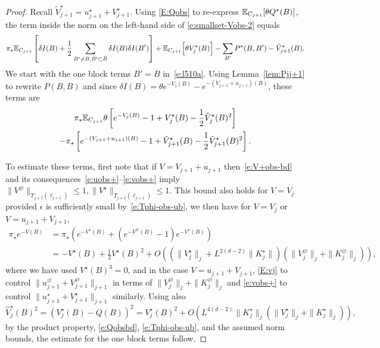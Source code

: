 \documentclass[11pt]{amsart}
\numberwithin{equation}{section}
\numberwithin{theorem}{section}
\newcommand{\1}{{\bf 1}}
\newcommand{\obs}{\star}
\newcommand{\Vbulk}{V^\varnothing}
\newcommand{\Vobs}{V^\obs}
\newcommand{\uobs}{u^\obs}
\newcommand{\Kbulk}{K^\varnothing}
\newcommand{\Kobs}{K^\obs}
\newcommand{\tVobs}{\tilde{V}^{\obs}}
\newcommand{\hVobs}{\hat V^\obs}
\begin{document}
\begin{proof}
  Recall $\tVobs_{j+1}=\uobs_{j+1}+\Vobs_{j+1}$. Using 
  \eqref{E:Qobs} to re-express $\E_{C_{j+1}}[\theta Q^\obs(B)]$,
  the term inside the norm on the left-hand side of \eqref{e:smallset-Vobs-2} equals
  \begin{equation}
    \label{e:l510a}
    \pi_\obs \E_{C_{j+1}}\qa{ \delta I(B)
      + \frac12  \sum_{ B' \neq  B, B'\subset \bar{B}} \delta I(B) \delta I(B')
    }
    + \E_{C_{j+1}}\qB{\theta \Vobs_j(B)}
    - \sum_{B'} P^\obs(B,B')
    - \tVobs_{j+1}(B).
  \end{equation}
  We start with the one block terms $B'=B$ in~\eqref{e:l510a}. Using Lemma~\ref{lem:Pjj+1} to rewrite $P(B,B)$
  and since $\delta I(B)=\theta
  e^{-V_j(B)}-e^{-(V_{j+1}+u_{j+1})(B)}$, these terms are
  \begin{multline} 
    \pi_\obs \E_{C_{j+1}}\theta  \qa{ e^{-V_j(B)}-1
      + \Vobs_j(B) - \frac12 \hVobs_j(B)^2}
    \\
      -\pi_\obs \qa{ e^{-(V_{j+1}+u_{j+1})(B)}-1+
        \tVobs_{j+1}(B)- \frac12 \tVobs_{j+1}(B)^2}. 
  \end{multline}
 
  To estimate these terms, first note that if 
  $V=V_{j+1}+u_{j+1}$ then~\eqref{e:V+obs-bd} and its 
  consequences~\eqref{e:uobs+}--\eqref{e:vobs+} imply
  $\|\Vbulk\|_{T_{j+1}(\ell_{j+1})}\leq 1,
  \|\Vobs\|_{T_{j+1}(\ell_{j+1})}\leq 1$.
  This bound also holds for $V=V_j$ provided $\epsilon$ is
  sufficiently small by~\eqref{e:Tphi-obs-ub},  we then have for $V=V_j$ or $V=u_{j+1}+V_{j+1}$,
  \begin{align}
    \nonumber
    \pi_{\obs}e^{-V(B)}
    &= \pi_{\obs}(e^{-\Vobs(B)} + (e^{-\Vbulk(B)}-1)e^{-\Vobs(B)}) \\
    \label{e:eVbound}
    &= - \Vobs(B) + \frac12 \Vobs(B)^2 +
    O((\|\Vobs_{j}\|_{j}+L^{2(d-2)}\|\Kobs_{j}\|)
      (\|\Vbulk_{j}\|_j+\|\Kbulk_{j}\|_j )),
  \end{align}
  where we have used $\Vobs(B)^{3}=0$,
  and in the case
  $V=u_{j+1}+V_{j+1}$, 
  \eqref{E:vj} 
  to control
  $\|u^{\varnothing}_{j+1}+\Vbulk_{j+1}\|_{j+1}$ in terms of
  $\|\Vbulk_j\|_j+\|\Kbulk_j\|_j$
  and \eqref{e:vobs+} to control $\|u^\obs_{j+1}+\Vobs_{j+1}\|_{j+1}$ similarly.
  Using also
  \begin{equation}
    \hVobs_j(B)^2
    = (\Vobs_j(B)-Q(B))^2
    = \Vobs_j(B)^2 + O(L^{4(d-2)}\|\Kobs_j\|_j (\|\Vobs_j\|_j +
    \|\Kobs_j\|_j)), 
  \end{equation}
  by the product property, \eqref{e:Qobsbd},
  \eqref{e:Tphi-obs-ub}, and the assumed norm bounds, the estimate for
  the one block terms follow.


\end{proof}
\end{document}
